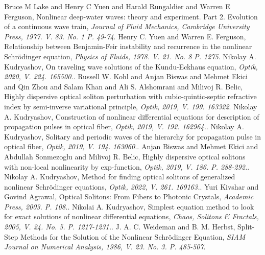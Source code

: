 \documentclass[12pt,a4paper]{article}
\begin{document}
\renewcommand\refname{References}
\begin{thebibliography}{9}
	 Bruce M Lake and Henry C Yuen and Harald Rungaldier and Warren E Ferguson, Nonlinear deep-water waves: theory and experiment. {P}art 2. {E}volution of a continuous wave train, \textit{Journal of Fluid Mechanics, Cambridge University Press, 1977. V. 83. No. 1 P. 49-74}.
	 Henry C. Yuen and Warren E. Ferguson, Relationship between {B}enjamin-{F}eir instability and recurrence in the nonlinear {S}chr\"{o}dinger equation, \textit{Physics of Fluids, 1978. V. 21. No. 8 P. 1275}.
	 Nikolay A. Kudryashov, On traveling wave solutions of the {K}undu-{E}ckhaus equation, \textit{Optik, 2020, V. 224. 165500.}.
	 Russell W. Kohl and Anjan Biswas and Mehmet Ekici and Qin Zhou and Salam Khan and Ali S. Alshomrani and Milivoj R.  Belic, Highly dispersive optical soliton perturbation with cubic-quintic-septic refractive index by semi-inverse variational principle, \textit{Optik, 2019, V. 199. 163322}.
	 Nikolay A. Kudryashov, Construction of nonlinear differential equations for description of propagation pulses in optical fiber, \textit{Optik, 2019, V. 192. 162964.}.
	 Nikolay A. Kudryashov, Solitary and periodic waves of the hierarchy for propagation pulse in optical fiber, \textit{Optik, 2019, V. 194. 163060.}.
	 Anjan Biswas and Mehmet Ekici and Abdullah Sonmezoglu and Milivoj R. Belic, Highly dispersive optical solitons with non-local nonlinearity by exp-function, \textit{Optik, 2019, V. 186. P. 288-292.}.
	 Nikolay A. Kudryashov, Method for finding optical solitons of generalized nonlinear {S}chr\"{o}dinger equations, \textit{Optik, 2022, V. 261. 169163.}.
	 Yuri Kivshar and Govind Agrawal, Optical Solitons: From Fibers to Photonic Crystals, \textit{Academic Press, 2003. P. 108.}.
	 Nikolai A. Kudryashov, Simplest equation method to look for exact solutions of nonlinear differential equations, \textit{Chaos, Solitons \& Fractals, 2005, V. 24. No. 5. P. 1217-1231.}.
	 J. A. C. Weideman and B. M. Herbst, Split-Step Methods for the Solution of the Nonlinear {S}chr\"{o}dinger Equation, \textit{SIAM Journal on Numerical Analysis, 1986, V. 23. No. 3. P. 485-507}.
\end{thebibliography}
\end{document}
